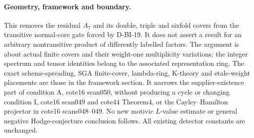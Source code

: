 \paragraph{Geometry, framework and boundary.}
This removes the residual $A_7$ and its double, triple and sixfold
covers from the transitive normal-core gate forced by D-BI-19.
It does not assert a result for an arbitrary nontransitive product
of differently labelled factors. The argument is about actual
finite covers and their weight-one multiplicity variations; the
integer spectrum and tensor identities belong to the associated
representation ring. The exact scheme-spreading, SGA finite-cover,
lambda-ring, K-theory and etale-weight placements are those in the
framework section. It narrows the supplier-existence part of
condition A, cote16 scan050, without producing a cycle or changing
condition I, cote16 scan049 and cote44 Theorem4, or the
Cayley--Hamilton projector in cote16 scans048--049. No new
motivic $L$-value estimate or general negative Hodge-conjecture
conclusion follows. All existing detector constants are unchanged.

